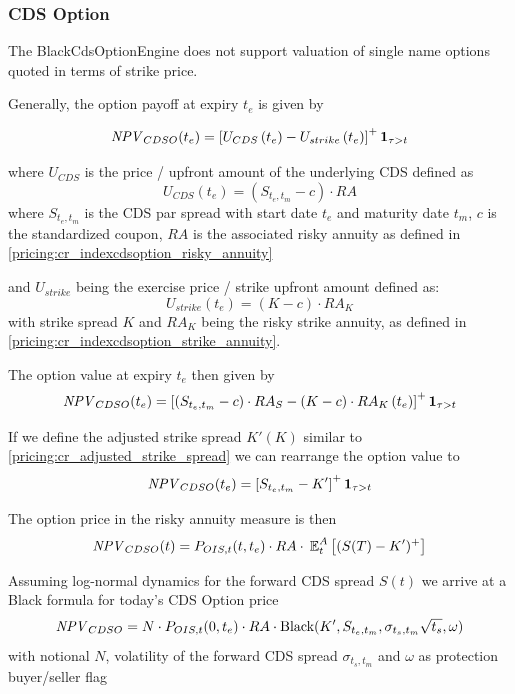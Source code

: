 \subsubsection{CDS Option}
\label{pricing:cr_cdsoption}

The BlackCdsOptionEngine does not support valuation of single name options quoted in terms of strike price.

Generally, the option payoff at expiry $t_e$ is given by

$$
\mathit{NPV}_{CDSO}(t_e)=\left[ U_{CDS}\left( t_e \right) - U_{strike}\left( t_e \right) \right]^+ \textbf{1}_{\tau>t}
$$

where $U_{CDS}$ is the price / upfront amount of the underlying CDS defined as
\begin{equation}
U_{CDS}\left( t_e \right) = \left( S_{t_e,t_m} - c \right) \cdot RA
\end{equation}
where $S_{t_e,t_m}$ is the CDS par spread with start date $t_e$  and maturity date $t_m$,
$c$ is the standardized coupon, $RA$ is the associated risky annuity as defined in \ref{pricing:cr_indexcdsoption_risky_annuity}


and $U_{strike}$ being the exercise price / strike upfront amount defined as:
\begin{equation}
U_{strike}\left( t_e \right) = \left( K - c \right) \cdot RA_K
\end{equation}
with strike spread $K$ and $ RA_K$ being the risky strike annuity, as defined in \ref{pricing:cr_indexcdsoption_strike_annuity}.


The option value at expiry $t_e$ then given by
$$
\mathit{NPV}_{CDSO}(t_e)=\left[ \left( S_{t_e,t_m} - c \right) \cdot RA_S - \left( K - c \right) \cdot RA_K\left( t_e \right) \right]^+ \textbf{1}_{\tau>t}
$$

If we define the adjusted strike spread $K'(K)$ similar to \ref{pricing:cr_adjusted_strike_spread}
we can rearrange the option value to
$$
\mathit{NPV}_{CDSO}(t_e)=\left[ S_{t_e,t_m} - K' \right]^+ \textbf{1}_{\tau>t}
$$

The option price in the risky annuity measure is then
$$
\mathit{NPV}_{CDSO}(t) = P_{OIS,t}(t,t_e) \cdot RA \cdot \:\operatorname{\mathbb{E}}^A_t\left[(S(T)-K')^+ \right]
$$

Assuming log-normal dynamics for the forward CDS spread $S(t)$ we
arrive at a Black formula for today's CDS Option price
\begin{equation}
\mathit{NPV}_{CDSO} = N \cdot P_{OIS,t}(0,t_e) \cdot RA \cdot \mbox{Black}(K', S_{t_e,t_m}, \sigma_{t_s,t_m} \sqrt{t_s},\omega)
\end{equation}
with notional $N$, volatility of the forward CDS spread $\sigma_{t_s,t_m}$ and $\omega$ as protection buyer/seller flag

